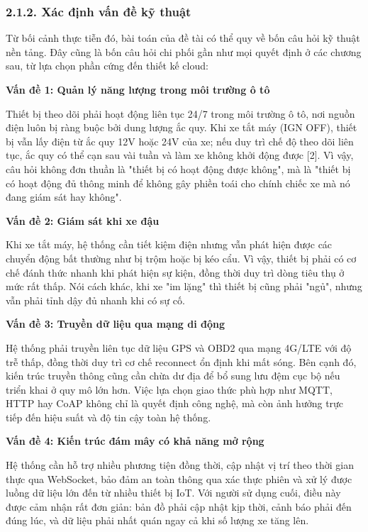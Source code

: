 \documentclass[a4paper]{extarticle}
\begin{document}
\subsubsection{2.1.2. Xác định vấn đề kỹ
thuật}\label{212-xuxe1c-ux111ux1ecbnh-vux1ea5n-ux111ux1ec1-kux1ef9-thuux1eadt}

Từ bối cảnh thực tiễn đó, bài toán của đề tài có thể quy về bốn câu hỏi
kỹ thuật nền tảng. Đây cũng là bốn câu hỏi chi phối gần như mọi quyết
định ở các chương sau, từ lựa chọn phần cứng đến thiết kế cloud:

\textbf{Vấn đề 1: Quản lý năng lượng trong môi trường ô tô}

Thiết bị theo dõi phải hoạt động liên tục 24/7 trong môi trường ô tô,
nơi nguồn điện luôn bị ràng buộc bởi dung lượng ắc quy. Khi xe tắt máy
(IGN OFF), thiết bị vẫn lấy điện từ ắc quy 12V hoặc 24V của xe; nếu duy
trì chế độ theo dõi liên tục, ắc quy có thể cạn sau vài tuần và làm xe
không khởi động được {[}2{]}. Vì vậy, câu hỏi không đơn thuần là "thiết
bị có hoạt động được không", mà là "thiết bị có hoạt động đủ thông minh
để không gây phiền toái cho chính chiếc xe mà nó đang giám sát hay
không".

\textbf{Vấn đề 2: Giám sát khi xe đậu}

Khi xe tắt máy, hệ thống cần tiết kiệm điện nhưng vẫn phát hiện được các
chuyển động bất thường như bị trộm hoặc bị kéo cẩu. Vì vậy, thiết bị
phải có cơ chế đánh thức nhanh khi phát hiện sự kiện, đồng thời duy trì
dòng tiêu thụ ở mức rất thấp. Nói cách khác, khi xe "im lặng" thì thiết
bị cũng phải "ngủ", nhưng vẫn phải tỉnh dậy đủ nhanh khi có sự cố.

\textbf{Vấn đề 3: Truyền dữ liệu qua mạng di động}

Hệ thống phải truyền liên tục dữ liệu GPS và OBD2 qua mạng 4G/LTE với độ
trễ thấp, đồng thời duy trì cơ chế reconnect ổn định khi mất sóng. Bên
cạnh đó, kiến trúc truyền thông cũng cần chừa dư địa để bổ sung lưu đệm
cục bộ nếu triển khai ở quy mô lớn hơn. Việc lựa chọn giao thức phù hợp
như MQTT, HTTP hay CoAP không chỉ là quyết định công nghệ, mà còn ảnh
hưởng trực tiếp đến hiệu suất và độ tin cậy toàn hệ thống.

\textbf{Vấn đề 4: Kiến trúc đám mây có khả năng mở rộng}

Hệ thống cần hỗ trợ nhiều phương tiện đồng thời, cập nhật vị trí theo
thời gian thực qua WebSocket, bảo đảm an toàn thông qua xác thực phiên
và xử lý được luồng dữ liệu lớn đến từ nhiều thiết bị IoT. Với người sử
dụng cuối, điều này được cảm nhận rất đơn giản: bản đồ phải cập nhật kịp
thời, cảnh báo phải đến đúng lúc, và dữ liệu phải nhất quán ngay cả khi
số lượng xe tăng lên.
\end{document}
